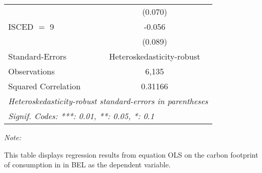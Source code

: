 \begin{table}[htbp!]
\begin{adjustbox}{width = 1\textwidth, max height = 0.95\textheight, center}
\begin{threeparttable}[b]
\begin{tabular}{lc}
                                & (0.070)\\   
            ISCED $=$ 9         & -0.056\\   
                                & (0.089)\\   
            \midrule 
            Standard-Errors     & Heteroskedasticity-robust \\   
            Observations        & 6,135\\  
            Squared Correlation & 0.31166\\  
            \midrule \midrule
            \multicolumn{2}{l}{\emph{Heteroskedasticity-robust standard-errors in parentheses}}\\
            \multicolumn{2}{l}{\emph{Signif. Codes: ***: 0.01, **: 0.05, *: 0.1}}\\
         \end{tabular}
         
         \begin{tablenotes}\item \medskip \textit{Note:}
            \item This table displays regression results from equation OLS on the carbon footprint of consumption in  in BEL as the dependent variable.  
         \end{tablenotes}
      \end{threeparttable}
   \end{adjustbox}
\end{table}



